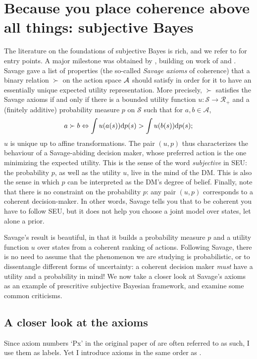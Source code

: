 \section{Because you place coherence above all things: subjective Bayes}
The literature on the foundations of subjective Bayes is rich, and we refer to \citep{PaIn09} for entry points. 
A major milestone was obtained by \cite{Sav53}, building on work of \cite{VoMo} and \cite{Ram}. 
Savage gave a list of properties (the so-called \emph{Savage axioms} of coherence) that a binary relation $\succ$ on the action space $\mathcal{A}$ should satisfy in order for it to have an essentially unique expected utility representation.
More precisely, $\succ$ satisfies the Savage axioms if and only if there is a bounded utility function $u:\mathcal{S}\rightarrow\mathcal{R}_+$ and a (finitely additive) probability measure $p$ on $\mathcal{S}$ such that for $a, b\in \mathcal{A}$, 
$$
a \succ b \Leftrightarrow \int u(a(s))\mathrm{d} p(s) > \int u(b(s))\mathrm{d} p(s);
$$
$u$ is unique up to affine transformations. 
The pair $(u,p)$ thus characterizes the behaviour of a Savage-abiding decision maker, whose preferred action is the one minimizing the expected utility. 
This is the sense of the word \emph{subjective} in SEU: the probability $p$, as well as the utility $u$, live in the mind of the DM. 
This is also the sense in which $p$ can be interpreted as the DM's degree of belief.
Finally, note that there is no constraint on the probability $p$: any pair $(u,p)$ corresponds to a coherent decision-maker. 
In other words, Savage tells you that to be coherent you have to follow SEU, but it does not help you choose a joint model over states, let alone a prior.

Savage's result is beautiful, in that it builds a probability measure $p$ and a utility function $u$ over states from a coherent ranking of actions.
Following Savage, there is no need to assume that the phenomenon we are studying is probabilistic, or to dissentangle different forms of uncertainty: a coherent decision maker \emph{must} have a utility and a probability in mind!
We now take a closer look at Savage's axioms as an example of prescritive subjective Bayesian framework, and examine some common criticisms.

\subsection{A closer look at the axioms}
Since axiom numbers `Px' in the original paper of \cite{Sav54} are often referred to as such, I use them as labels. Yet I introduce axioms in the same order as \cite{PaIn09}.

